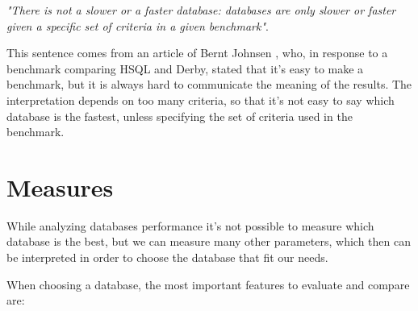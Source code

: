 \label{axiom} \emph{"There is not a slower or a faster database: databases are only slower or faster given a specific set of criteria in a given benchmark"}.

This sentence comes from an article of Bernt Johnsen \cite{Bernt}, who, in response to a benchmark comparing HSQL and Derby, stated that it's easy to make a benchmark, but it is always hard to communicate the meaning of the results. The interpretation depends on too many criteria, so that it's not easy to say which database is the fastest, unless specifying the set of criteria used in the benchmark.
	
		\section{Measures}
While analyzing databases performance it's not possible to measure which database is the best, but we can measure many other parameters, which then can be interpreted in order to choose the database that fit our needs.

When choosing a database, the most important features to evaluate and compare are:

